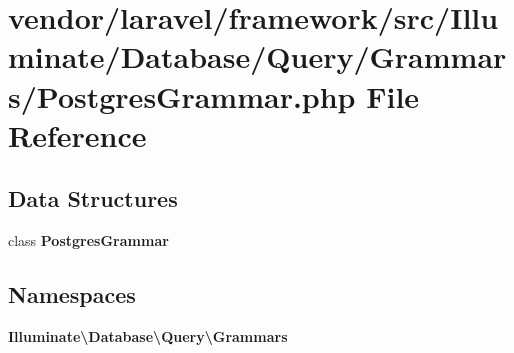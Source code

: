 \section{vendor/laravel/framework/src/\+Illuminate/\+Database/\+Query/\+Grammars/\+Postgres\+Grammar.php File Reference}
\label{_query_2_grammars_2_postgres_grammar_8php}
\subsection*{Data Structures}
\begin{DoxyCompactItemize}
\item 
class {\bf Postgres\+Grammar}
\end{DoxyCompactItemize}
\subsection*{Namespaces}
\begin{DoxyCompactItemize}
\item 
 {\bf Illuminate\textbackslash{}\+Database\textbackslash{}\+Query\textbackslash{}\+Grammars}
\end{DoxyCompactItemize}
